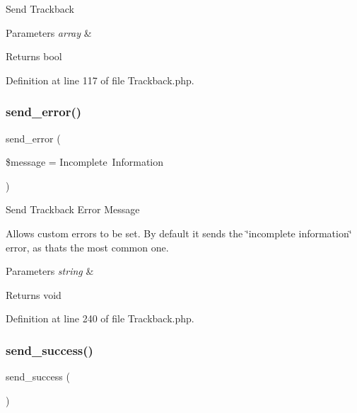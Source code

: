 Send Trackback


\begin{DoxyParams}{Parameters}
{\em array} & \\
\hline
\end{DoxyParams}
\begin{DoxyReturn}{Returns}
bool 
\end{DoxyReturn}


Definition at line 117 of file Trackback.\+php.

\mbox{\label{class_c_i___trackback_a1d4188b1ba4d71ad5392bee635102e87}} 
\subsubsection{\texorpdfstring{send\_error()}{send\_error()}}
{\footnotesize\ttfamily send\+\_\+error (\begin{DoxyParamCaption}\item[{}]{\$message = {\ttfamily \textquotesingle{}Incomplete~Information\textquotesingle{}} }\end{DoxyParamCaption})}

Send Trackback Error Message

Allows custom errors to be set. By default it sends the \char`\"{}incomplete information\char`\"{} error, as that\textquotesingle{}s the most common one.


\begin{DoxyParams}{Parameters}
{\em string} & \\
\hline
\end{DoxyParams}
\begin{DoxyReturn}{Returns}
void 
\end{DoxyReturn}


Definition at line 240 of file Trackback.\+php.

\mbox{\label{class_c_i___trackback_a57468453a4dc88340fdf12fb6e314248}} 
\subsubsection{\texorpdfstring{send\_success()}{send\_success()}}
{\footnotesize\ttfamily send\+\_\+success (\begin{DoxyParamCaption}{ }\end{DoxyParamCaption})}

